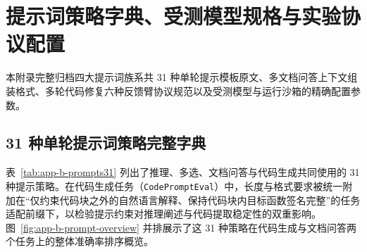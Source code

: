 \chapter{提示词策略字典、受测模型规格与实验协议配置}\label{app:prompts}

本附录完整归档四大提示词族系共 31 种单轮提示模板原文、多文档问答上下文组装格式、多轮代码修复六种反馈臂协议规范以及受测模型与运行沙箱的精确配置参数。

\section{31 种单轮提示词策略完整字典}

表~\ref{tab:app-b-prompts31} 列出了推理、多选、文档问答与代码生成共同使用的 31 种提示策略。在代码生成任务（\texttt{CodePromptEval}）中，长度与格式要求被统一附加在“仅约束代码块之外的自然语言解释、保持代码块内目标函数签名完整”的任务适配前缀下，以检验提示约束对推理阐述与代码提取稳定性的双重影响。图~\ref{fig:app-b-prompt-overview} 并排展示了这 31 种策略在代码生成与文档问答两个任务上的整体准确率排序概览。

